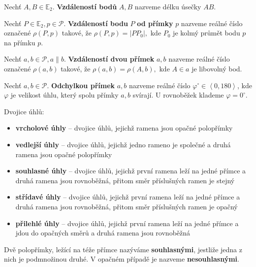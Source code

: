 \begin{definition}
  Nechť $A,B\in \mathbb E_2$. \textbf{Vzdáleností bodů} $A,B$ nazveme délku úsečky $AB.$
\end{definition}


\begin{definition}
  Nechť $P\in \mathbb E_2, p \in \mathscr P.$ \textbf{Vzdáleností bodu} $P$ \textbf{od přímky} $p$ nazveme reálné číslo označené $\rho(P,p)$ takové, že $\rho(P,p)=|PP_0|,$ kde $P_0$ je kolmý průmět bodu $p$ na přímku $p$.
\end{definition}

\begin{definition}
  Nechť $a,b \in \mathscr P, a \parallel b.$ \textbf{Vzdáleností dvou přímek} $a,b$ nazveme reálné číslo označené $\rho(a,b)$ takové, že $\rho(a,b)=\rho(A,b),$ kde $A\in a$ je libovolný bod.
\end{definition}

\begin{definition}
  Nechť $a,b\in \mathscr P.$ \textbf{Odchylkou přímek} $a,b$ nazveme reálné číslo $\varphi^\circ\in \left <0, 180\right>$, kde $\varphi$ je velikost úhlu, který spolu přímky $a,b$ svírají. U rovnoběžek klademe $\varphi = 0^\circ.$
\end{definition}

\begin{definition}
  Dvojice úhlů:
  \begin{itemize}
    \item \textbf{vrcholové úhly} -- dvojice úhlů, jejichž ramena jsou opačné polopřímky
    \item \textbf{vedlejší úhly} --	dvojice úhlů, jejichž jedno rameno je společné a druhá ramena jsou opačné polopřímky
    \item \textbf{souhlasné úhly} -- dvojice úhlů, jejichž první ramena leží na jedné přímce a druhá ramena jsou rovnoběžná, přitom směr příslušných ramen je stejný
    \item \textbf{střídavé úhly}	-- dvojice úhlů, jejichž první ramena leží na jedné přímce a druhá ramena jsou rovnoběžná, přitom směr příslušných ramen je opačný
    \item \textbf{přilehlé úhly} -- dvojice úhlů, jejichž první ramena leží na jedné přímce a jdou do opačných směrů a druhá ramena jsou rovnoběžná
  \end{itemize}
\end{definition}

\begin{definition}
  Dvě polopřímky, ležící na téže přímce nazýváme \textbf{souhlasnými}, jestliže jedna z nich je podmnožinou druhé. V opačném případě je nazveme \textbf{nesouhlasnými}.
\end{definition}

